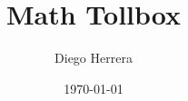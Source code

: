 %
\author[D. Herrera]{Diego Herrera}
\title[Toolbox]{Math Tollbox}
\date{\today}
%
%
\makeatletter
{}
\makeatother
%
\renewcommand{\PrelimWords}
    {MTBox -- D. Herrera -- Version 1.0.0}
%

